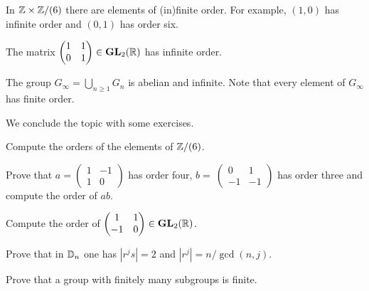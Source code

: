 \begin{example}
        In $\mathbb{Z}\times\mathbb{Z}/(6)$ there are elements of 
        (in)finite order. For example, $(1,0)$ 
        has infinite order and 
        $(0,1)$ has order six. 
 \end{example}
                        
\begin{example}
        The matrix $\begin{pmatrix}1&1\\0&1\end{pmatrix}\in\mathbf{GL}_2(\mathbb{R})$ has infinite order.
\end{example}                     
                                
\begin{example}
        The group $G_\infty=\bigcup_{n\geq1}G_n$ is abelian and infinite. Note that every element of 
        $G_\infty$ has finite order. 
\end{example}
          
We conclude the topic with some exercises. 

\begin{exercise}
        Compute the orders of the elements of $\mathbb{Z}/(6)$.
\end{exercise}       

\begin{exercise}
        Prove that $a=\begin{pmatrix}1&-1\\1&0\end{pmatrix}$ has order four, $b=\
        \begin{pmatrix}0&1\\-1&-1\end{pmatrix}$ has order three and 
        compute the order of $ab$.%
\end{exercise}
                                
\begin{exercise}
        Compute the order of 
        $\begin{pmatrix}1&1\\-1&0\end{pmatrix}\in\mathbf{GL}_2(\mathbb{R})$.
\end{exercise}
                                
\begin{exercise}
        Prove that in $\mathbb{D}_n$ one has 
        $|r^js|=2$ and $|r^j|=n/\gcd(n,j)$.
\end{exercise}
                                
\begin{exercise}
        Prove that a group with finitely many subgroups
        is finite. 
\end{exercise}


